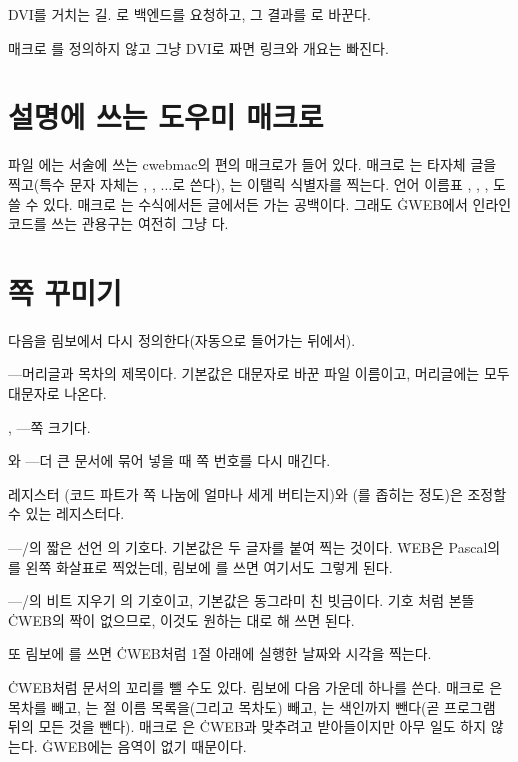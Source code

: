 \bull DVI를 거치는 길. 로  백엔드를 요청하고,
그 결과를 로 바꾼다.

\noindent 매크로 를 정의하지 않고 그냥 DVI로 짜면 링크와 개요는 빠진다.

\section{설명에 쓰는 도우미 매크로}
파일 에는 서술에 쓰는 cwebmac의 편의 매크로가 들어 있다.
매크로 는 타자체 글을 찍고(특수 문자 자체는
\cw{\bs\bs}, , $\ldots$로 쓴다), 는
이탤릭 식별자를 찍는다. 언어 이름표 , ,
, 도 쓸 수 있다. 매크로 \cw{\bs,}는 수식에서든
글에서든 가는 공백이다. 그래도 \.{GWEB}에서 인라인 코드를 쓰는 관용구는 여전히
그냥 다.

\section{쪽 꾸미기}
다음을 림보에서 다시 정의한다(자동으로 들어가는  뒤에서).

\bull {}---머리글과 목차의 제목이다.
기본값은 대문자로 바꾼 파일 이름이고, 머리글에는 모두 대문자로 나온다.

\bull {}, ---쪽 크기다.

\bull {}와
---더 큰 문서에 묶어 넣을 때 쪽 번호를 다시 매긴다.

\bull 레지스터 (코드 파트가 쪽 나눔에 얼마나 세게 버티는지)와
(\cw{//}를 좁히는 정도)은 조정할 수 있는 레지스터다.

\bull {}---\GO/의 짧은 선언 \cw{:=}의 기호다. 기본값은 두 글자를 붙여
찍는 것이다. \.{WEB}은 Pascal의 \cw{:=}를 왼쪽 화살표로 찍었는데, 림보에
를 쓰면 여기서도 그렇게 된다.

\bull {}---\GO/의 비트 지우기 \cw{\&\string^}의 기호이고, 기본값은
동그라미 친 빗금이다. 기호 \cw{:=}처럼 본뜰 \.{CWEB}의 짝이 없으므로, 이것도
원하는 대로 해 쓰면 된다.

\noindent 또 림보에 를 쓰면 \.{CWEB}처럼 1절 아래에 실행한 날짜와
시각을 찍는다.

\.{CWEB}처럼 문서의 꼬리를 뺄 수도 있다. 림보에 다음 가운데 하나를 쓴다.
매크로 은 목차를 빼고, 는 절 이름 목록을(그리고
목차도) 빼고, 는 색인까지 뺀다(곧 프로그램 뒤의 모든 것을 뺀다).
매크로 은 \.{CWEB}과 맞추려고 받아들이지만 아무 일도 하지 않는다.
\.{GWEB}에는  음역이 없기 때문이다.

